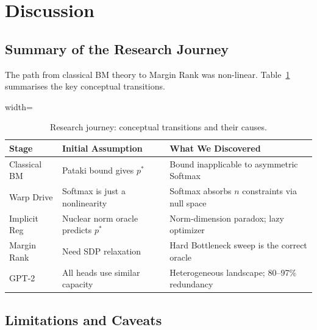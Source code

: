 
\section{Discussion}
\label{sec:discussion}

\subsection{Summary of the Research Journey}

The path from classical BM theory to Margin Rank was non-linear. Table~\ref{tab:journey}
summarises the key conceptual transitions.

\begin{table}[H]
  \centering
  \begin{adjustbox}{width=\columnwidth}
  \begin{tabular}{lll}
    \toprule
    \textbf{Stage} & \textbf{Initial Assumption} & \textbf{What We Discovered} \\
    \midrule
    Classical BM    & Pataki bound gives $p^*$         & Bound inapplicable to asymmetric Softmax \\
    Warp Drive      & Softmax is just a nonlinearity   & Softmax absorbs $n$ constraints via null space \\
    Implicit Reg    & Nuclear norm oracle predicts $p^*$ & Norm-dimension paradox; lazy optimizer \\
    Margin Rank     & Need SDP relaxation              & Hard Bottleneck sweep is the correct oracle \\
    GPT-2           & All heads use similar capacity   & Heterogeneous landscape; 80--97\% redundancy \\
    \bottomrule
  \end{tabular}
  \end{adjustbox}
  \caption{Research journey: conceptual transitions and their causes.}
  \label{tab:journey}
\end{table}

\subsection{Limitations and Caveats}

